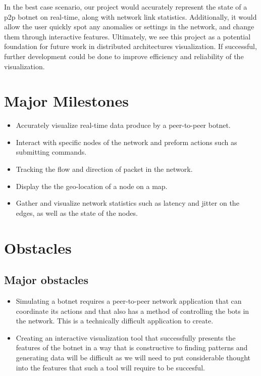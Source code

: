 \documentclass{proc}
\begin{document}
In the best case scenario, our project would accurately represent the state of a p2p botnet on real-time, along with network link statistics. Additionally, it would allow the user quickly spot any anomalies or settings in the network, and change them through interactive features. Ultimately, we see this project as a potential foundation for future work in distributed architectures visualization. If successful, further development could be done to improve efficiency and reliability of the visualization. 
\section{Major Milestones}
\begin{itemize}
\item Accurately visualize real-time data produce by a peer-to-peer botnet.
\item Interact with specific nodes of the network and preform actions such as submitting commands.
\item Tracking the flow and direction of packet in the network.
\item Display the the geo-location of a node on a map.
\item Gather and visualize network statistics such as latency and jitter on the edges, as well as the state of the nodes.
\end{itemize}

\section{Obstacles}

\subsection{Major obstacles} %
\begin{itemize}
\item Simulating a botnet requires a peer-to-peer network application that can coordinate its actions and that also has a method of controlling the bots in the network. This is a technically difficult application to create.
\item Creating an interactive visualization tool that successfully presents the features of the botnet in a way that is constructive to finding patterns and generating data will be difficult as we will need to put considerable thought into the features that such a tool will require to be succesful.

\end{itemize}
\end{document}
